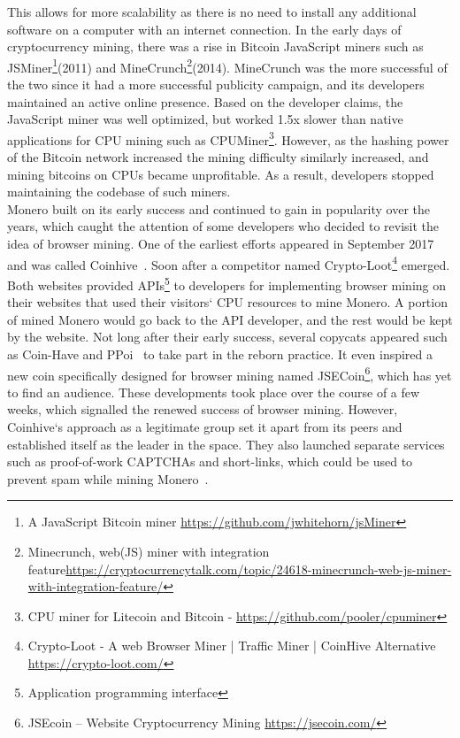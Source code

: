 This allows for more scalability as there is no need to install any additional software on a computer with an internet connection. In the early days of cryptocurrency mining, there was a rise in Bitcoin JavaScript miners such as JSMiner\footnote{A JavaScript Bitcoin miner \url{https://github.com/jwhitehorn/jsMiner}}(2011) and MineCrunch\footnote{Minecrunch, web(JS) miner with integration feature\url{https://cryptocurrencytalk.com/topic/24618-minecrunch-web-js-miner-with-integration-feature/}}(2014). MineCrunch was the more successful of the two since it had a more successful publicity campaign, and its developers maintained an active online presence. Based on the developer claims, the JavaScript miner was well optimized, but worked 1.5x slower than native applications for CPU mining such as CPUMiner\footnote{CPU miner for Litecoin and Bitcoin - \url{https://github.com/pooler/cpuminer}}. However, as the hashing power of the Bitcoin network increased the mining difficulty similarly increased, and mining bitcoins on CPUs became unprofitable. As a result, developers stopped maintaining the codebase of such miners.
\\
Monero built on its early success and continued to gain in popularity over the years, which caught the attention of some developers who decided to revisit the idea of browser mining. One of the earliest efforts appeared in September 2017 and was called Coinhive~\cite{coinhive}. Soon after a competitor named Crypto-Loot\footnote{Crypto-Loot - A web Browser Miner | Traffic Miner | CoinHive Alternative \url{https://crypto-loot.com/}} emerged. Both websites provided APIs\footnote{Application programming interface} to developers for implementing browser mining on their websites that used their visitors` CPU resources to mine Monero. A portion of mined Monero would go back to the API developer, and the rest would be kept by the website. Not long after their early success, several copycats appeared such as Coin-Have and PPoi~\cite{coinhivecopycats} to take part in the reborn practice. It even inspired a new coin specifically designed for browser mining named JSECoin\footnote{JSEcoin – Website Cryptocurrency Mining \url{https://jsecoin.com/}}, which has yet to find an audience. These developments took place over the course of a few weeks, which signalled the renewed success of browser mining. However, Coinhive`s approach as a legitimate group set it apart from its peers and established itself as the leader in the space. They also launched separate services such as proof-of-work CAPTCHAs and short-links, which could be used to prevent spam while mining Monero~\cite{coinhive}.

